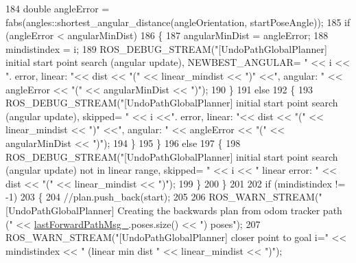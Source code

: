 \begin{DoxyCode}
184                     \textcolor{keywordtype}{double} angleError = fabs(angles::shortest\_angular\_distance(angleOrientation, 
      startPoseAngle));
185                     \textcolor{keywordflow}{if} (angleError < angularMinDist)
186                     \{
187                         angularMinDist = angleError;
188                         mindistindex = i;
189                         ROS\_DEBUG\_STREAM(\textcolor{stringliteral}{"[UndoPathGlobalPlanner] initial start point search (angular
       update), NEWBEST\_ANGULAR= "} << i << \textcolor{stringliteral}{". error, linear: "}<<  dist << \textcolor{stringliteral}{"("} << linear\_mindist << \textcolor{stringliteral}{")"} <<\textcolor{stringliteral}{", angular: "} 
      << angleError << \textcolor{stringliteral}{"("} << angularMinDist << \textcolor{stringliteral}{")"});
190                     \}
191                     \textcolor{keywordflow}{else}
192                     \{
193                         ROS\_DEBUG\_STREAM(\textcolor{stringliteral}{"[UndoPathGlobalPlanner] initial start point search (angular
       update), skipped= "} << i <<\textcolor{stringliteral}{". error, linear: "}<<  dist << \textcolor{stringliteral}{"("} << linear\_mindist << \textcolor{stringliteral}{")"} <<\textcolor{stringliteral}{", angular: "}  << 
      angleError << \textcolor{stringliteral}{"("} << angularMinDist << \textcolor{stringliteral}{")"});
194                     \}
195                 \}
196                 \textcolor{keywordflow}{else}
197                 \{
198                     ROS\_DEBUG\_STREAM(\textcolor{stringliteral}{"[UndoPathGlobalPlanner] initial start point search (angular update)
       not in linear range, skipped= "} << i << \textcolor{stringliteral}{" linear error: "} << dist << \textcolor{stringliteral}{"("} << linear\_mindist << \textcolor{stringliteral}{")"});
199                 \}
200             \}
201 
202             \textcolor{keywordflow}{if} (mindistindex != -1)
203             \{
204                 \textcolor{comment}{//plan.push\_back(start);}
205 
206                 ROS\_WARN\_STREAM(\textcolor{stringliteral}{"[UndoPathGlobalPlanner] Creating the backwards plan from odom tracker path
       ("} << \hyperlink{classcl__move__base__z_1_1undo__path__global__planner_1_1UndoPathGlobalPlanner_a9a4a6e40f5b6cb5f77dedbc5b6170871}{lastForwardPathMsg\_}.poses.size() << \textcolor{stringliteral}{") poses"});
207                 ROS\_WARN\_STREAM(\textcolor{stringliteral}{"[UndoPathGlobalPlanner] closer point to goal i="} << mindistindex << \textcolor{stringliteral}{"
       (linear min dist "} << linear\_mindist << \textcolor{stringliteral}{")"});

\end{DoxyCode}
